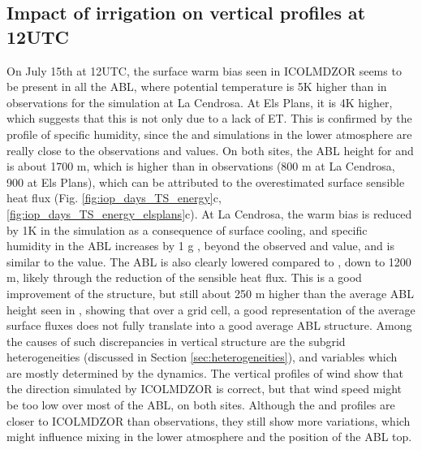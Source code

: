 \clearpage

\subsection{Impact of irrigation on vertical profiles at 12UTC}
\label{sec:vertical_profiles}

On July 15th at 12UTC, the surface warm bias seen in ICOLMDZOR seems to be present in all the ABL, where potential temperature is 5K higher than in observations for the \noirr simulation at La Cendrosa. At Els Plans, it is 4K higher, which suggests that this is not only due to a lack of ET. This is confirmed by the profile of specific humidity, since the \noirr and \irr simulations in the lower atmosphere are really close to the observations and \mesomean values.
On both sites, the ABL height for \noirr and \irr is about 1700 m, which is higher than in observations (800 m at La Cendrosa, 900 at Els Plans), which can be attributed to the overestimated surface sensible heat flux (Fig. \ref{fig:iop_days_TS_energy}c,  \ref{fig:iop_days_TS_energy_elsplans}c). 
At La Cendrosa, the warm bias is reduced by 1K in the \irrboost simulation as a consequence of surface cooling, and specific humidity in the ABL increases by 1 g \perkg, beyond the observed and \mesomean value, and is similar to the \mesoexact value. 
The ABL is also clearly lowered compared to \noirr, down to 1200 m, likely through the reduction of the sensible heat flux. This is a good improvement of the structure, but still about 250 m higher than the average ABL height seen in \mesomean, showing that over a grid cell, a good representation of the average surface fluxes does not fully translate into a good average ABL structure.
Among the causes of such discrepancies in vertical structure are the subgrid heterogeneities (discussed in Section \ref{sec:heterogeneities}), and variables which are mostly determined by the dynamics. The vertical profiles of wind show that the direction simulated by ICOLMDZOR is correct, but that wind speed might be too low over most of the ABL, on both sites. Although the \mesomean and \mesoexact profiles are closer to ICOLMDZOR than observations, they still show more variations, which might influence mixing in the lower atmosphere and the position of the ABL top. %

